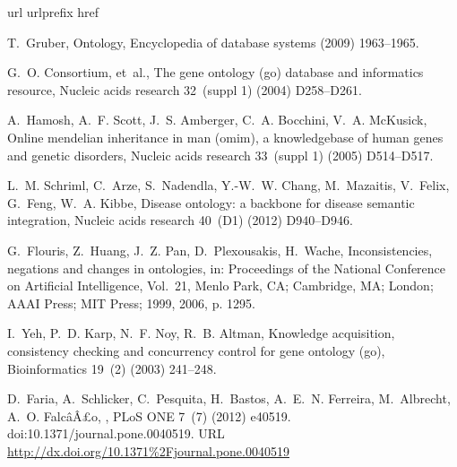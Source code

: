 \documentclass{article}
\theoremstyle{definition}
\begin{document}

\newpage

\flushbottom
%
%
\begin{thebibliography}{10}
\expandafter\ifx\csname url\endcsname\relax
  \def\url#1{\texttt{#1}}\fi
\expandafter\ifx\csname urlprefix\endcsname\relax\def\urlprefix{URL }\fi
\expandafter\ifx\csname href\endcsname\relax
  \def\href#1#2{#2} \def\path#1{#1}\fi

T.~Gruber, Ontology, Encyclopedia of database systems (2009) 1963--1965.

G.~O. Consortium, et~al., The gene ontology (go) database and informatics
  resource, Nucleic acids research 32~(suppl 1) (2004) D258--D261.

A.~Hamosh, A.~F. Scott, J.~S. Amberger, C.~A. Bocchini, V.~A. McKusick, Online
  mendelian inheritance in man (omim), a knowledgebase of human genes and
  genetic disorders, Nucleic acids research 33~(suppl 1) (2005) D514--D517.

L.~M. Schriml, C.~Arze, S.~Nadendla, Y.-W.~W. Chang, M.~Mazaitis, V.~Felix,
  G.~Feng, W.~A. Kibbe, Disease ontology: a backbone for disease semantic
  integration, Nucleic acids research 40~(D1) (2012) D940--D946.

G.~Flouris, Z.~Huang, J.~Z. Pan, D.~Plexousakis, H.~Wache, Inconsistencies,
  negations and changes in ontologies, in: Proceedings of the National
  Conference on Artificial Intelligence, Vol.~21, Menlo Park, CA; Cambridge,
  MA; London; AAAI Press; MIT Press; 1999, 2006, p. 1295.

I.~Yeh, P.~D. Karp, N.~F. Noy, R.~B. Altman, Knowledge acquisition, consistency
  checking and concurrency control for gene ontology (go), Bioinformatics
  19~(2) (2003) 241--248.

D.~Faria, A.~Schlicker, C.~Pesquita, H.~Bastos, A.~E.~N. Ferreira, M.~Albrecht,
  A.~O. FalcâÂ£o,
  \href{http://dx.doi.org/10.1371%2Fjournal.pone.0040519}{Mining go annotations
  for improving annotation consistency}, PLoS ONE 7~(7) (2012) e40519.
\newblock \href {http://dx.doi.org/10.1371/journal.pone.0040519}
  {\path{doi:10.1371/journal.pone.0040519}}.
\newline\urlprefix\url{http://dx.doi.org/10.1371%2Fjournal.pone.0040519}


\end{thebibliography}
\end{document}
